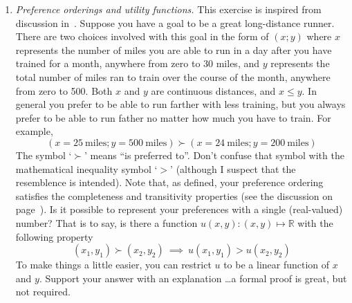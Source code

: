 \begin{enumerate}
\item \emph{Preference orderings and utility functions.}  This
  exercise is inspired from discussion in~\cite{resnik:1987}.  Suppose
  you have a goal to be a great long-distance runner.  There are two
  choices involved with this goal in the form of $(x;y)$ where $x$
  represents the number of miles you are able to run in a day after
  you have trained for a month, anywhere from zero to 30 miles, and
  $y$ represents the total number of miles ran to train over the
  course of the month, anywhere from zero to 500. Both $x$ and $y$ are
  continuous distances, and $x \le y$. In general you prefer to be
  able to run farther with less training, but you always prefer to be
  able to run father no matter how much you have to train. For
  example,
  \[
  (x=25~\text{miles}; y=500~\text{miles}) \succ (x=24~\text{miles}; y=200~\text{miles})
  \]
  The symbol `$\succ$' means ``is preferred to''.  Don't confuse that
  symbol with the mathematical inequality symbol `$>$' (although I
  suspect that the resemblence is intended). Note that, as defined, your
  preference ordering satisfies the completeness and transitivity
  properties (see the discussion on page~\pageref{rules-of-consistency}). 
  Is it possible to represent your
  preferences with a single (real-valued) number? That is to say, is
  there a function $u(x,y) : (x,y) \mapsto \mathbb{R}$ with the
  following property
  \[
  (x_1,y_1) \succ (x_2,y_2)~\implies~u(x_1,y_1) > u(x_2,y_2)
  \]
  To make things a little easier, you can restrict $u$ to be a linear
  function of $x$ and $y$. Support your answer with an explanation
  \ldots a formal proof is great, but not required.


\end{enumerate}
